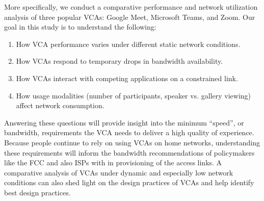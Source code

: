 More specifically, we conduct a comparative performance and network utilization analysis of three popular VCAs: Google Meet, Microsoft Teams, and Zoom. %
Our goal in this study is to understand the following:
\begin{enumerate}[noitemsep]
    \item How VCA performance varies under different static network conditions.
    \item How VCAs respond to temporary drops in bandwidth availability.
    \item How VCAs interact with competing applications on a constrained link.
    \item How usage modalities (number of participants, speaker vs. gallery viewing) affect network consumption.
\end{enumerate}

Answering these questions will provide insight into the minimum  ``speed'', or bandwidth, requirements the VCA needs to deliver a high quality of experience. Because people continue to rely on using VCAs on home networks, understanding these requirements will inform the bandwidth recommendations of policymakers like the FCC and also ISPs with in provisioning of the access links. A comparative analysis of VCAs under dynamic and especially low network conditions can also shed light on the design practices of VCAs and help identify best design practices. %

